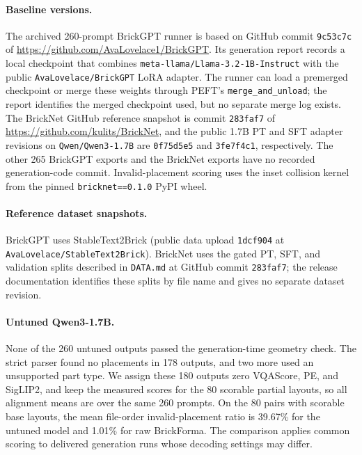 \begin{samepage}
\paragraph{Baseline versions.} The archived 260-prompt BrickGPT runner is based on GitHub commit \texttt{9c53c7c} of \url{https://github.com/AvaLovelace1/BrickGPT}. Its generation report records a local checkpoint that combines \texttt{meta-llama/Llama-3.2-1B-Instruct} with the public \texttt{AvaLovelace/BrickGPT} LoRA adapter. The runner can load a premerged checkpoint or merge these weights through PEFT's \texttt{merge\_and\_unload}; the report identifies the merged checkpoint used, but no separate merge log exists. The BrickNet GitHub reference snapshot is commit \texttt{283faf7} of \url{https://github.com/kulits/BrickNet}, and the public 1.7B PT and SFT adapter revisions on \texttt{Qwen/Qwen3-1.7B} are \texttt{0f75d5e5} and \texttt{3fe7f4c1}, respectively. The other 265 BrickGPT exports and the BrickNet exports have no recorded generation-code commit. Invalid-placement scoring uses the inset collision kernel from the pinned \texttt{bricknet==0.1.0} PyPI wheel.

\paragraph{Reference dataset snapshots.} BrickGPT uses StableText2Brick (public data upload \texttt{1dcf904} at \texttt{AvaLovelace/StableText2Brick}). BrickNet uses the gated PT, SFT, and validation splits described in \texttt{DATA.md} at GitHub commit \texttt{283faf7}; the release documentation identifies these splits by file name and gives no separate dataset revision.
\end{samepage}

\paragraph{Untuned Qwen3-1.7B.} None of the 260 untuned outputs passed the generation-time geometry check. The strict parser found no placements in 178 outputs, and two more used an unsupported part type. We assign these 180 outputs zero VQAScore, PE, and SigLIP2, and keep the measured scores for the 80 scorable partial layouts, so all alignment means are over the same 260 prompts. On the 80 pairs with scorable base layouts, the mean file-order invalid-placement ratio is 39.67\% for the untuned model and 1.01\% for raw BrickForma. The comparison applies common scoring to delivered generation runs whose decoding settings may differ.

